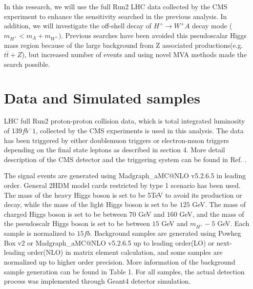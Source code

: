\documentclass[
12pt, %
a4paper, %
oneside, %
headinclude,footinclude, %
BCOR5mm, %
]{scrartcl}
\begin{document}
In this research, we will use the full Run2 LHC data collected by the CMS experiment
to enhance the sensitivity searched in the previous analysis.
In addition, we will investigate the off-shell decay of $H^+ \rightarrow W^+A$ decay mode 
($m_{H^+} < m_A + m_{W^+})$. Previous searches have been avoided this 
pseudoscalar Higgs mass region because of the large background from Z associated productions(e.g. $t\bar{t}+Z$),
but increased number of events and using novel MVA methods made the search possible.

\section{Data and Simulated samples}
LHC full Run2 proton-proton collision data, which is total integrated luminosity of 139$fb^-1$, 
collected by the CMS experiments is used in this analysis.
The data has been triggered by either doublemuon triggers or electron-muon triggers depending on
the final state leptons as described in section 4. More detail description of the CMS detector and
the triggering system can be found in Ref. \cite{Detector} \cite{Trigger}.

The signal events are generated using Madgraph\_aMC@NLO v5.2.6.5\cite{Madgraph} in leading order. 
General 2HDM model cards restricted by type 1 scenario has been used. 
The mass of the heavy Higgs boson is set to be 5TeV to avoid its production or decay, 
while the mass of the light Higgs boson is set to be $125$ GeV.
The mass of charged Higgs boson is set to be between $70$ GeV and $160$ GeV, 
and the mass of the pseudoscalr Higgs boson is set to be between $15$ GeV and $m_{H^+} - 5$ GeV. 
Each sample is normalized to $15fb$.
Background samples are generated using Powheg Box v2\cite{Powheg} or Madgraph\_aMC@NLO v5.2.6.5\cite{Madgraph} 
up to leading order(LO) or next-leading order(NLO) in matrix element calculation, 
and some samples are normalized up to higher order precision.
More information of the background sample generation can be found in Table 1.
For all samples, the actual detection process was implemented through Geant4 detector simulation\cite{Geant4}.
\end{document}
